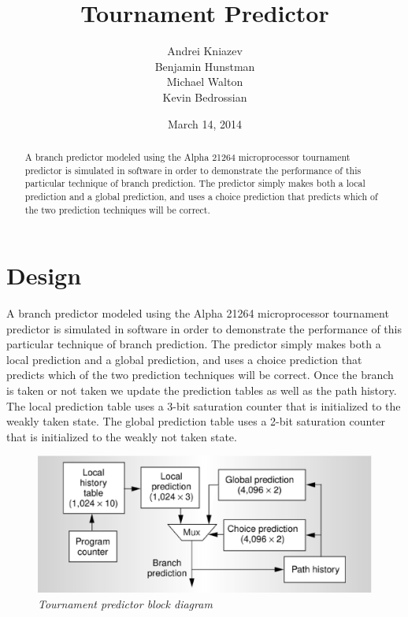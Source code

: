 \documentclass[]{report}   %
\begin{document}

\title{Tournament Predictor}   %
\author{Andrei Kniazev\\
  Benjamin Hunstman\\
  Michael Walton\\
  Kevin Bedrossian\\
}         %
\date{March 14, 2014}    %
\maketitle

\begin{abstract}
  A branch predictor modeled using the Alpha 21264 microprocessor tournament predictor is simulated in software in order to demonstrate the performance of this particular technique of branch prediction.
  The predictor simply makes both a local prediction and a global prediction, and uses a choice prediction that predicts which of the two prediction techniques will be correct.
\end{abstract}

\tableofcontents

\chapter{Design}
A branch predictor modeled using the Alpha 21264 microprocessor tournament predictor is simulated in software in order to demonstrate the performance of this particular technique of branch prediction.
The predictor simply makes both a local prediction and a global prediction, and uses a choice prediction that predicts which of the two prediction techniques will be correct.
Once the branch is taken or not taken we update the prediction tables as well as the path history.
The local prediction table uses a 3-bit saturation counter that is initialized to the weakly taken state.
The global prediction table uses a 2-bit saturation counter that is initialized to the weakly not taken state.

\begin{center}
  \begin{figure}
    \label{block-diagram}
    \includegraphics[width=4.5in]{block_diagram.eps}
    \caption*{\textit{Tournament predictor block diagram\cite{kessler}}}
  \end{figure}
\end{center}
\end{document}
